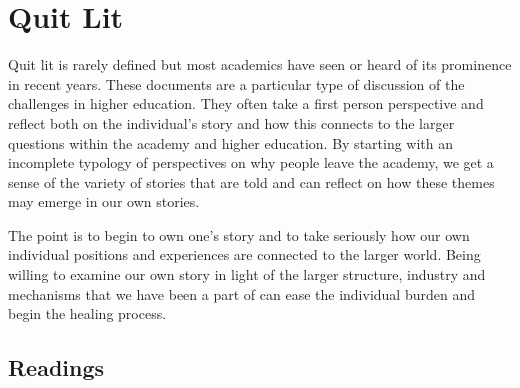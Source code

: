 \documentclass[]{book}
\begin{document}
\chapter{Quit Lit}\label{quit-lit}

Quit lit is rarely defined but most academics have seen or heard of its
prominence in recent years. These documents are a particular type of
discussion of the challenges in higher education. They often take a
first person perspective and reflect both on the individual's story and
how this connects to the larger questions within the academy and higher
education. By starting with an incomplete typology of perspectives on
why people leave the academy, we get a sense of the variety of stories
that are told and can reflect on how these themes may emerge in our own
stories.

The point is to begin to own one's story and to take seriously how our
own individual positions and experiences are connected to the larger
world. Being willing to examine our own story in light of the larger
structure, industry and mechanisms that we have been a part of can ease
the individual burden and begin the healing process.

\section{Readings}\label{readings}
\end{document}
